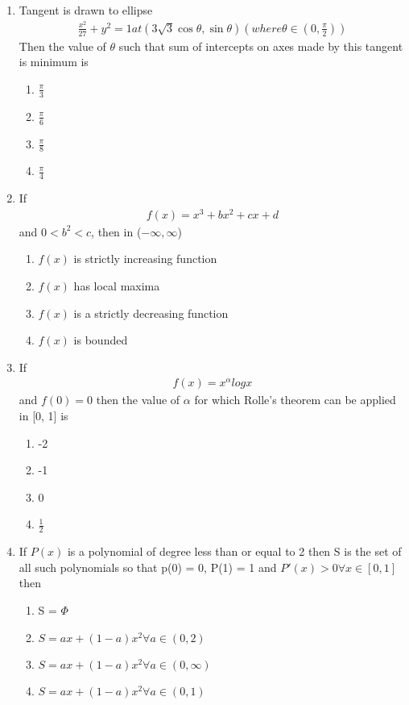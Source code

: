 \begin{enumerate}[label=\arabic*.,ref=\thesubsection.\theenumi]
\item Tangent is drawn to ellipse
\begin{align*}
\frac{x^2}{27} + y^2 = 1 at (3\sqrt{3}\cos \theta, \sin \theta)(where \theta \in (0, \frac{\pi}{2}))
\end{align*}
Then the value of $\theta$ such that sum of intercepts on axes made by this tangent is minimum is
\begin{enumerate}
\item $\frac{\pi}{3}$
\item $\frac{\pi}{6}$
\item $\frac{\pi}{8}$
\item $\frac{\pi}{4}$
\end{enumerate}

\item If 
\begin{align*}
f(x) = x^3 + bx^2 + cx + d 
\end{align*} 
and $0 < b^2 < c$, then in ($-\infty, \infty$)
\begin{enumerate}
\item $f(x)$ is strictly increasing function
\item $f(x)$ has local maxima
\item $f(x)$ is a strictly decreasing function 
\item $f(x)$ is bounded
\end{enumerate}

\item If 
\begin{align*}
f(x) = x^{\alpha} log x
\end{align*}
and $f(0) = 0$ then the value of $\alpha$ for which Rolle's theorem can be applied in [0, 1] is
\begin{enumerate}
\item -2
\item -1
\item 0
\item $\frac{1}{2}$
\end{enumerate}

\item If $P(x)$ is a polynomial of degree less than or equal to 2 then S is the set of all such polynomials so that p(0) = 0, P(1) = 1 and  $P'(x) > 0 \forall x \in [0,1]$ then 
\begin{enumerate}
\item S = $\Phi$
\item $S = ax + (1 - a)x^2 \forall a\in(0, 2)$
\item $S = ax + (1 - a)x^2 \forall a\in(0, \infty)$
\item $S = ax + (1 - a)x^2 \forall a\in(0, 1)$
\end{enumerate}
 

\end{enumerate}
